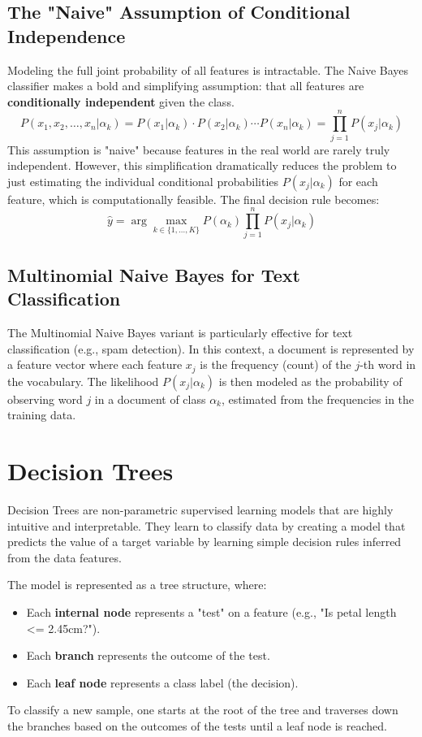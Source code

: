 \subsection*{The "Naive" Assumption of Conditional Independence}
Modeling the full joint probability of all features is intractable. The Naive Bayes classifier makes a bold and simplifying assumption: that all features are \textbf{conditionally independent} given the class.
$$ P(x_1, x_2, \dots, x_n | \alpha_k) = P(x_1 | \alpha_k) \cdot P(x_2 | \alpha_k) \cdots P(x_n | \alpha_k) = \prod_{j=1}^{n} P(x_j | \alpha_k) $$
This assumption is "naive" because features in the real world are rarely truly independent. However, this simplification dramatically reduces the problem to just estimating the individual conditional probabilities $P(x_j | \alpha_k)$ for each feature, which is computationally feasible. The final decision rule becomes:
$$ \hat{y} = \arg\max_{k \in \{1, \dots, K\}} P(\alpha_k) \prod_{j=1}^{n} P(x_j | \alpha_k) $$

\subsection*{Multinomial Naive Bayes for Text Classification}
The Multinomial Naive Bayes variant is particularly effective for text classification (e.g., spam detection). In this context, a document is represented by a feature vector where each feature $x_j$ is the frequency (count) of the $j$-th word in the vocabulary. The likelihood $P(x_j | \alpha_k)$ is then modeled as the probability of observing word $j$ in a document of class $\alpha_k$, estimated from the frequencies in the training data.

\section{Decision Trees}
\label{sec:decision_trees}
Decision Trees are non-parametric supervised learning models that are highly intuitive and interpretable. They learn to classify data by creating a model that predicts the value of a target variable by learning simple decision rules inferred from the data features.

The model is represented as a tree structure, where:
\begin{itemize}
    \item Each \textbf{internal node} represents a "test" on a feature (e.g., "Is petal length <= 2.45cm?").
    \item Each \textbf{branch} represents the outcome of the test.
    \item Each \textbf{leaf node} represents a class label (the decision).
\end{itemize}
To classify a new sample, one starts at the root of the tree and traverses down the branches based on the outcomes of the tests until a leaf node is reached.

